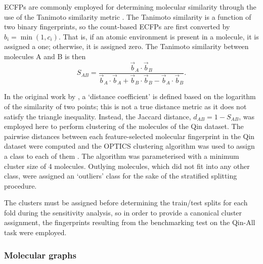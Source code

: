 ECFPs are commonly employed for determining molecular similarity through the use
of the Tanimoto similarity metric
\cite{tanimotoElementaryMathematicalTheory1958,bajuszWhyTanimotoIndex2015,butinaUnsupervisedDataBase1999}.
The Tanimoto similarity is a function of two binary fingerprints, so the
count-based ECFPs are first converted by $b_i = \min (1, c_i)$. That is, if an
atomic environment is present in a molecule, it is assigned a one; otherwise, it
is assigned zero. The Tanimoto similarity between molecules A and B is then
\begin{equation}
    S_{AB} = \frac{\vec{b}_A \cdot \vec{b}_B}{\vec{b}_A \cdot \vec{b}_A + \vec{b}_B \cdot \vec{b}_B - \vec{b}_A \cdot \vec{b}_B}.
\end{equation}

In the original work by \citet{tanimotoElementaryMathematicalTheory1958}, a
`distance coefficient' is defined based on the logarithm of the similarity of
two points; this is not a true distance metric as it does not satisfy the
triangle inequality. Instead, the Jaccard distance, $d_{AB} = 1 - S_{AB}$, was
employed here to perform clustering of the molecules of the Qin dataset. The
pairwise distances between each feature-selected molecular fingerprint in the
Qin dataset were computed and the OPTICS clustering algorithm was used to assign
a class to each of them \cite{ankerstOPTICSOrderingPoints1999}. The algorithm
was parameterised with a minimum cluster size of 4 molecules. Outlying
molecules, which did not fit into any other class, were assigned an `outliers'
class for the sake of the stratified splitting procedure.

The clusters must be assigned before determining the train/test splits for each
fold during the sensitivity analysis, so in order to provide a canonical cluster
assignment, the fingerprints resulting from the benchmarking test on the Qin-All
task were employed.

\subsubsection{Molecular graphs}


